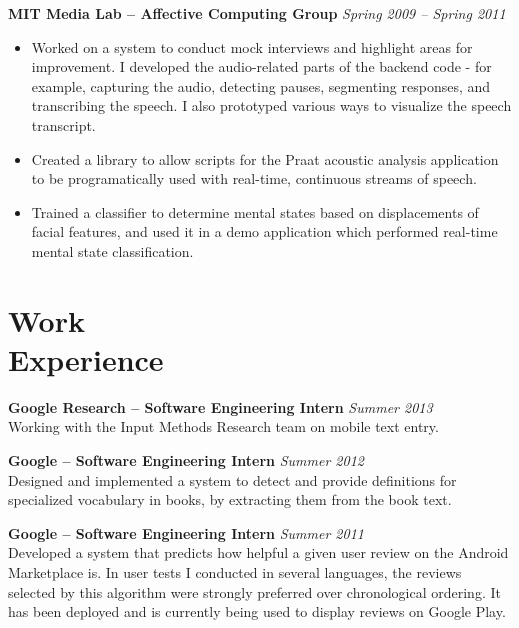 \documentclass[margin,line]{resume}
\begin{document}
\begin{resume}

\textbf{MIT Media Lab -- Affective Computing Group} \hfill \textsl{Spring 2009 -- Spring 2011}
\begin{itemize}
\item Worked on a system to conduct mock interviews and highlight areas for improvement. I developed the audio-related parts of the backend code - for example, capturing the audio, detecting pauses, segmenting responses, and transcribing the speech. I also prototyped various ways to visualize the speech transcript.
\item Created a library to allow scripts for the Praat acoustic analysis application to be programatically used with real-time, continuous streams of speech.
\item Trained a classifier to determine mental states based on displacements of facial features, and used it in a demo application which performed real-time mental state classification.
\end{itemize}


\section{\mysidestyle Work\\Experience}

\textbf{Google Research -- Software Engineering Intern} \hfill \textsl{Summer 2013}\\
Working with the Input Methods Research team on mobile text entry.

\textbf{Google -- Software Engineering Intern} \hfill \textsl{Summer 2012}\\
Designed and implemented a system to detect and provide definitions for specialized vocabulary in books, by extracting them from the book text.

\textbf{Google -- Software Engineering Intern} \hfill \textsl{Summer 2011}\\
Developed a system that predicts how helpful a given user review on the Android Marketplace is.
In user tests I conducted in several languages, the reviews selected by this algorithm
were strongly preferred over chronological ordering. It has been deployed and is currently being used to display reviews on Google Play.


\end{resume}
\end{document}

